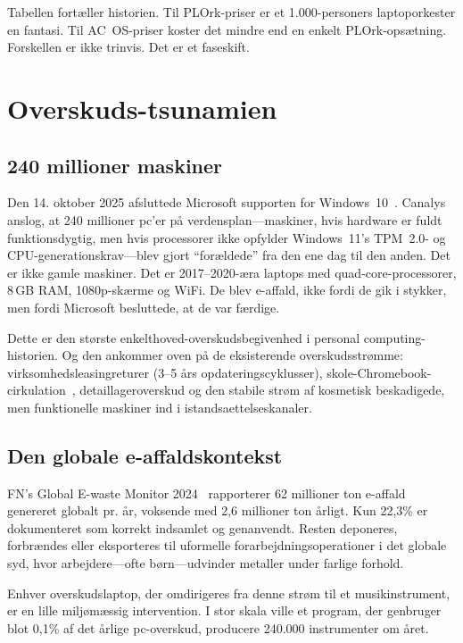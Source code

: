 \documentclass[10pt,letterpaper,twocolumn]{article}
\begin{document}
Tabellen fort{\ae}ller historien. Til PLOrk-priser er et 1.000-personers laptoporkester en fantasi. Til AC~OS-priser koster det mindre end en enkelt PLOrk-ops{\ae}tning. Forskellen er ikke trinvis. Det er et faseskift.


\section{Overskuds-tsunamien}
\label{sec:surplus}

\subsection{240 millioner maskiner}

Den 14. oktober 2025 afsluttede Microsoft supporten for Windows~10~\citep{canalys2024windows}. Canalys anslog, at 240 millioner pc'er p{\aa} verdensplan---maskiner, hvis hardware er fuldt funktionsdygtig, men hvis processorer ikke opfylder Windows~11's TPM~2.0- og CPU-generationskrav---blev gjort ``for{\ae}ldede'' fra den ene dag til den anden. Det er ikke gamle maskiner. Det er 2017--2020-{\ae}ra laptops med quad-core-processorer, 8\,GB RAM, 1080p-sk{\ae}rme og WiFi. De blev e-affald, ikke fordi de gik i stykker, men fordi Microsoft besluttede, at de var f{\ae}rdige.

Dette er den st{\o}rste enkelthoved-overskudsbegivenhed i personal computing-historien. Og den ankommer oven p{\aa} de eksisterende overskudsstr{\o}mme: virksomhedsleasingreturer (3--5 {\aa}rs opdateringscyklusser), skole-Chromebook-cirkulation~\citep{pirg2023chromebook}, detaillageroverskud og den stabile str{\o}m af kosmetisk beskadigede, men funktionelle maskiner ind i istandsaettelseskanaler.

\subsection{Den globale e-affaldskontekst}

FN's Global E-waste Monitor 2024~\citep{forti2024ewaste} rapporterer 62 millioner ton e-affald genereret globalt pr. {\aa}r, voksende med 2,6 millioner ton {\aa}rligt. Kun 22,3\% er dokumenteret som korrekt indsamlet og genanvendt. Resten deponeres, forbr{\ae}ndes eller eksporteres til uformelle forarbejdningsoperationer i det globale syd, hvor arbejdere---ofte b{\o}rn---udvinder metaller under farlige forhold.

Enhver overskudslaptop, der omdirigeres fra denne str{\o}m til et musikinstrument, er en lille milj{\o}m{\ae}ssig intervention. I stor skala ville et program, der genbruger blot 0,1\% af det {\aa}rlige pc-overskud, producere 240.000 instrumenter om {\aa}ret.
\end{document}

